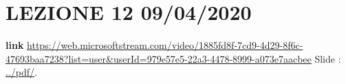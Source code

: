 \section*{LEZIONE 12 09/04/2020}
\textbf{link} \url{https://web.microsoftstream.com/video/1885fd8f-7cd9-4d29-8f6c-47693baa7238?list=user&userId=979e57e5-22a3-4478-8999-a073e7aacbee}\newline
\newline
Slide : \url{../pdf/}.